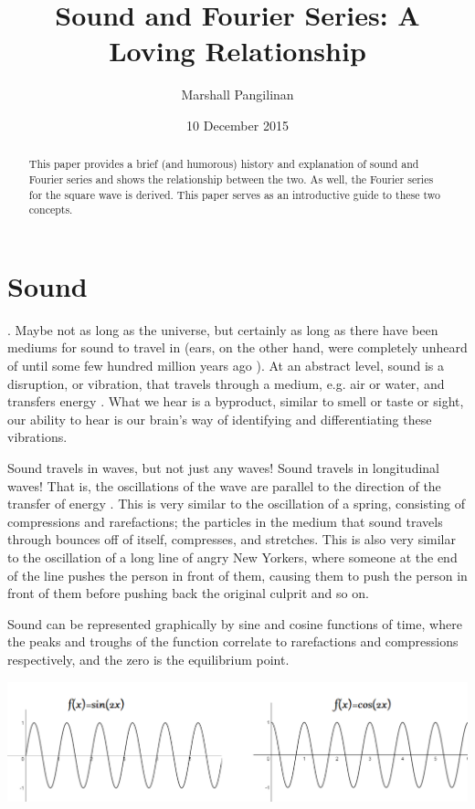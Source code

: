 \documentclass{tufte-handout}
\title{Sound and Fourier Series: A Loving Relationship}
\author{Marshall Pangilinan}
\date{10 December 2015}
\begin{document}
\maketitle

\begin{abstract}
\noindent This paper provides a brief (and humorous) history and explanation of sound and Fourier series and shows the relationship between the two. As well, the Fourier series for the square wave is derived. This paper serves as an introductive guide to these two concepts.
\end{abstract}

\section{Sound}
. Maybe not as long as the universe, but certainly as long as there have been mediums for sound to travel in (ears, on the other hand, were completely unheard of until some few hundred million years ago \cite{Ear}). At an abstract level, sound is a disruption, or vibration, that travels through a medium, e.g. air or water, and transfers energy \cite{Harmony, Sound}. What we hear is a byproduct, similar to smell or taste or sight, our ability to hear is our brain's way of identifying and differentiating these vibrations. 

Sound travels in waves, but not just any waves! Sound travels in longitudinal waves! That is, the oscillations of the wave are parallel to the direction of the transfer of energy \cite{Sound}. This is very similar to the oscillation of a spring, consisting of compressions and rarefactions; the particles in the medium that sound travels through bounces off of itself, compresses, and stretches. This is also very similar to the oscillation of a long line of angry New Yorkers, where someone at the end of the line pushes the person in front of them, causing them to push the person in front of them before pushing back the original culprit and so on.

Sound can be represented graphically by sine and cosine functions of time, where the peaks and troughs of the function correlate to rarefactions and compressions respectively, and the zero is the equilibrium point.

	\includegraphics[width=\textwidth]{SinCos.png}
\end{document}
